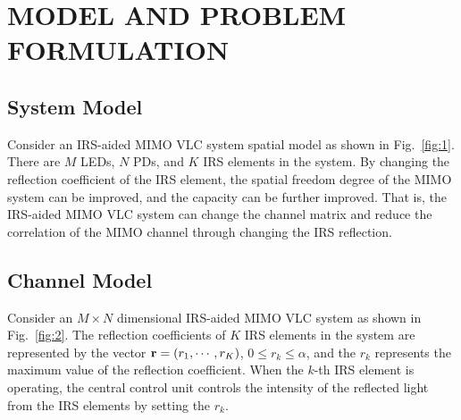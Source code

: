 \documentclass[conference]{IEEEtran}
\begin{document}
\section{MODEL AND PROBLEM FORMULATION}

 \subsection{System Model}
   Consider an IRS-aided MIMO VLC system spatial model as shown in 
   Fig.~\ref{fig:1}.
   There are $M$ LEDs, $N$ PDs, and $K$ IRS elements in 
   the system. By changing the reflection coefficient of the IRS element, 
   the spatial freedom degree of the MIMO system can be improved, 
   and the capacity can be further improved. That is, 
   the IRS-aided MIMO VLC system can change the channel matrix 
   and reduce the correlation of the MIMO channel through 
   changing the IRS reflection.
 \subsection{Channel Model}
   Consider an $M \times N$ dimensional IRS-aided MIMO VLC system as shown 
   in Fig.~\ref{fig:2}. The reflection coefficients of $K$ IRS 
   elements in the system are represented by the vector 
   ${\bf{r}} = ({r_1}, \cdots , {r_K})$, $0 \le {r_k} \le \alpha $,  
   and the ${r_k}$ represents the maximum value of the reflection coefficient. 
   When the $k$-th IRS element is operating, the central 
   control unit controls the intensity of the reflected light from 
   the IRS elements by setting the ${r_k}$.
   
\end{document}
